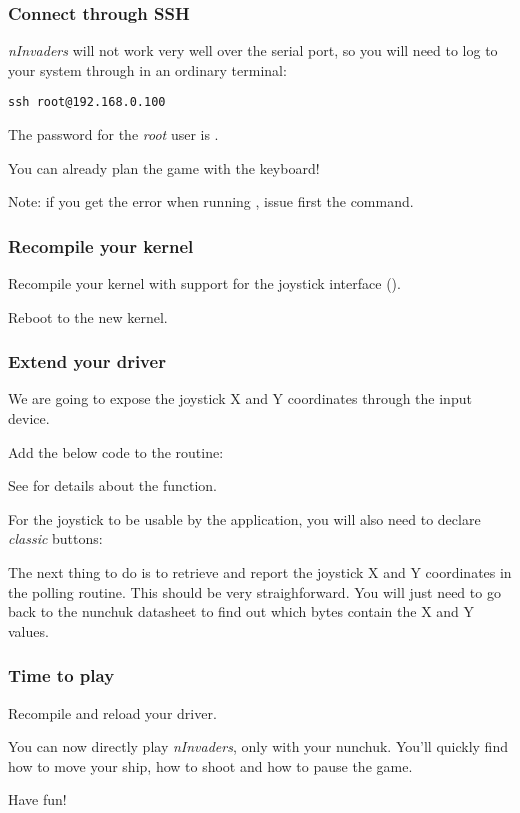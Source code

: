 \subsubsection{Connect through SSH}

{\em nInvaders} will not work very well over the serial port,
so you will need to log to your system through  in an
ordinary terminal:

\begin{verbatim}
ssh root@192.168.0.100
\end{verbatim}

The password for the {\em root} user is .

You can already plan the  game with
the keyboard!

Note: if you get the error 
when running , issue first the
 command.

\subsubsection{Recompile your kernel}

Recompile your kernel with support for the joystick interface
().

Reboot to the new kernel.

\subsubsection{Extend your driver}

We are going to expose the joystick X and Y coordinates through
the input device.

Add the below code to the  routine:

See  for details about
the  function.

For the joystick to be usable by the application, you will also
need to declare {\em classic} buttons:


The next thing to do is to retrieve and report the joystick X and Y
coordinates in the polling routine. This should be very straighforward.
You will just need to go back to the nunchuk datasheet to find out
which bytes contain the X and Y values.

\subsubsection{Time to play}

Recompile and reload your driver.

You can now directly play {\em nInvaders}, only with your nunchuk.
You'll quickly find how to move your ship, how to shoot and how
to pause the game.

Have fun!

